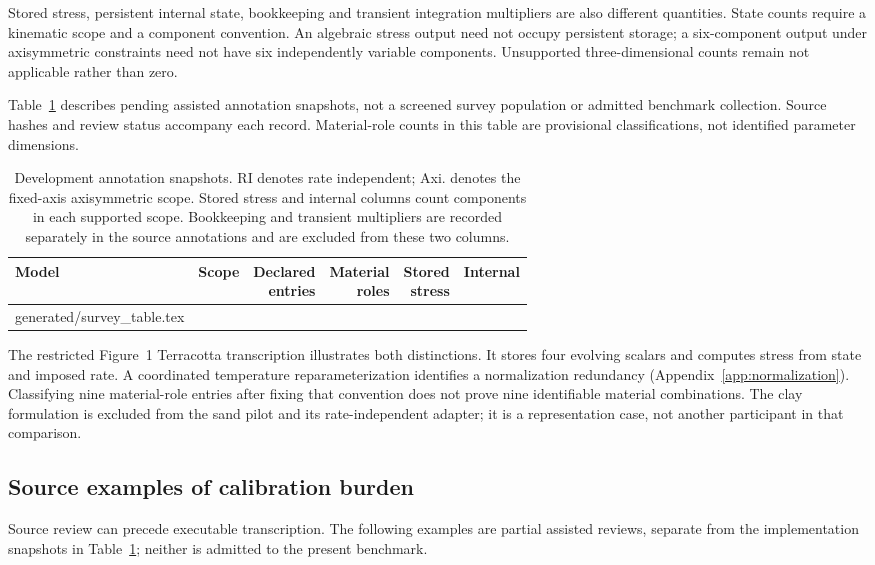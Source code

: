 \documentclass[11pt,a4paper]{article}
\newcommand{\AnnotatedFormulationCount}{pending}
\begin{document}
Stored stress, persistent internal state, bookkeeping and transient integration multipliers are also different quantities. State counts require a kinematic scope and a component convention. An algebraic stress output need not occupy persistent storage; a six-component output under axisymmetric constraints need not have six independently variable components. Unsupported three-dimensional counts remain not applicable rather than zero.

Table~\ref{tab:annotations} describes \AnnotatedFormulationCount{} assisted annotation snapshots, not a screened survey population or admitted benchmark collection. Source hashes and review status accompany each record. Material-role counts in this table are provisional classifications, not identified parameter dimensions.
\begin{table}[htbp]
\centering\small
\caption{Development annotation snapshots. RI denotes rate independent; Axi. denotes the fixed-axis axisymmetric scope. Stored stress and internal columns count components in each supported scope. Bookkeeping and transient multipliers are recorded separately in the source annotations and are excluded from these two columns.}
\label{tab:annotations}
\begin{tabular}{l l r r r r}
\toprule
Model & Scope & \shortstack{Declared\\entries} & \shortstack{Material\\roles} & \shortstack{Stored\\stress} & Internal\\
\midrule
{} generated/survey_table.tex
\bottomrule
\end{tabular}
\end{table}

The restricted Figure~1 Terracotta transcription \cite{terracotta} illustrates both distinctions. It stores four evolving scalars and computes stress from state and imposed rate. A coordinated temperature reparameterization identifies a normalization redundancy (Appendix~\ref{app:normalization}). Classifying nine material-role entries after fixing that convention does not prove nine identifiable material combinations. The clay formulation is excluded from the sand pilot and its rate-independent adapter; it is a representation case, not another participant in that comparison.

\subsection{Source examples of calibration burden}
Source review can precede executable transcription. The following examples are partial assisted reviews, separate from the implementation snapshots in Table~\ref{tab:annotations}; neither is admitted to the present benchmark.
\end{document}
